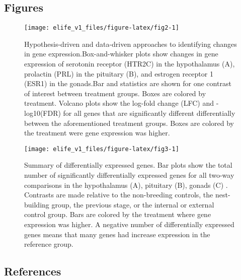 \hypertarget{figures}{%
\subsection{Figures}\label{figures}}

\begin{Schunk}
\begin{figure}
\texttt{[image: elife\_v1\_files/figure-latex/fig2-1]} \caption[Hypothesis-driven and data-driven approaches to identifying changes in gene expression.Box-and-whisker plots show changes in gene expression of serotonin receptor (HTR2C) in the hypothalamus (A), prolactin (PRL) in the pituitary (B), and estrogen receptor 1 (ESR1) in the gonads.Bar and statistics are shown for one contrast of interest between treatment groups]{Hypothesis-driven and data-driven approaches to identifying changes in gene expression.Box-and-whisker plots show changes in gene expression of serotonin receptor (HTR2C) in the hypothalamus (A), prolactin (PRL) in the pituitary (B), and estrogen receptor 1 (ESR1) in the gonads.Bar and statistics are shown for one contrast of interest between treatment groups. Boxes are colored by treatment. Volcano plots show the log-fold change (LFC) and -log10(FDR) for all genes that are significantly different differentially between the aforementioned treatment groups. Boxes are colored by the treatment were gene expression was higher.}\label{fig:fig2}
\end{figure}
\end{Schunk}

\begin{Schunk}
\begin{figure}
\texttt{[image: elife\_v1\_files/figure-latex/fig3-1]} \caption[Summary of differentially expressed genes]{Summary of differentially expressed genes. Bar plots show the total number of significantly differentially expressed genes for all two-way comparisons in the hypothalamus (A), pituitary (B), gonads (C) . Contrasts are made relative to the non-breeding controls, the nest-building group, the previous stage, or the internal or external control group. Bars are colored by the treatment where gene expression was higher. A negative number of differentially expressed genes means that many genes had increase expression in the reference group.}\label{fig:fig3}
\end{figure}
\end{Schunk}

\newpage

\hypertarget{references}{%
\subsection{References}\label{references}}


